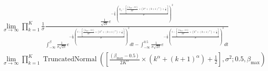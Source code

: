 \documentclass[11pt]{amsart}
\begin{document}
\begin{align}
&\lim_{\sigma \rightarrow \infty}  \prod_{k=1}^K  \frac{1}{\sigma} \frac{\frac{1}{\sqrt{2\pi}} e^{-\frac{1}{2}\left(\frac{p_{ij} - \left[ \frac{(\beta_{\max} - 0.5)}{2K^{\alpha}} \times  \left(  k^{\alpha} + (k+1)^{\alpha} \right) +\frac{1}{2}\right]  }{\sigma}\right)^2}}{\int_{-\infty}^\beta \frac{1}{\sigma\sqrt{2\pi}} e^{-\frac{1}{2}\left(\frac{t-  \left[ \frac{(\beta_{\max} - 0.5)}{2K^{\alpha}} \times  \left(  k^{\alpha} + (k+1)^{\alpha} \right) +\frac{1}{2} \right] }{\sigma}\right)^2 }dt -\int_{-\infty}^{0.5} \frac{1}{\sigma\sqrt{2\pi}} e^{-\frac{1}{2}\left(\frac{t-  \left[ \frac{(\beta_{\max} - 0.5)}{2K^{\alpha}} \times  \left(  k^{\alpha} + (k+1)^{\alpha} \right) +\frac{1}{2} \right] }{\sigma}\right)^2 }dt} \\
& \lim_{\sigma \rightarrow \infty} 
\prod_{k=1}^K  \operatorname{TruncatedNormal}(\left[ \frac{(\beta_{\max} - 0.5)}{2K^{\alpha}} \times  \left(  k^{\alpha} + (k+1)^{\alpha} \right) +\frac{1}{2} \right], \sigma^{2}; 0.5, \beta_{\max})
\end{align}
\end{document}
